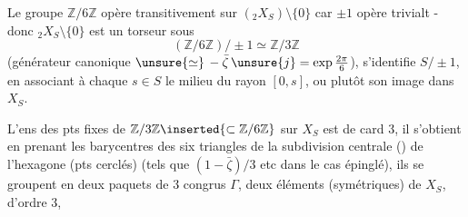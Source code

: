 
Le groupe $\mathbb Z/6\mathbb Z$ opère transitivement sur $({}_2X_S)\setminus\{0\}$ car $\pm1$ opère trivialt - donc \({}_2X_S\setminus\{0\}\) est un torseur sous
\[
(\mathbb Z/6\mathbb Z)/\pm1\simeq\mathbb Z/3\mathbb Z
\]
 (générateur canonique $\unsure{\simeq}\,-\bar\zeta\,\unsure{j}=\exp\frac{2\pi}{6}$),
  s'identifie  $S/\pm1$, en associant à chaque $s\in S$ le milieu du rayon $[0,s]$, ou plutôt son image dans $X_S$.

L'ens des pts fixes de $\mathbb Z/3\mathbb Z\inserted{\subset\mathbb Z/6\mathbb Z}$ sur $X_S$ est de card 3, il s'obtient en prenant les barycentres des six triangles de la subdivision centrale () de l'hexagone (pts cerclés) (tels que $(1-\bar\zeta)/3$ etc dans le cas épinglé), ils se groupent en deux paquets de 3  congrus  $\Gamma$,  deux éléments (symétriques) de $X_S$, d'ordre 3,

